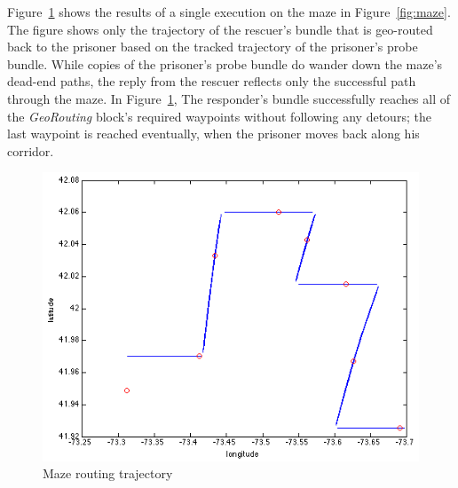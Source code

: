 Figure~\ref{fig:mazeExperiment} shows the results of a single
execution on the maze in Figure~\ref{fig:maze}. The figure shows only
the trajectory of the rescuer's bundle that is geo-routed back to the
prisoner based on the tracked trajectory of the prisoner's probe
bundle. While copies of the prisoner's probe bundle do wander down the
maze's dead-end paths, the reply from the rescuer reflects only the
successful path through the maze. In Figure~\ref{fig:mazeExperiment},
The responder's bundle successfully reaches all of the {\em
  GeoRouting} block's required waypoints without following any
detours; the last waypoint is reached eventually, when the prisoner
moves back along his corridor.
\begin{figure}
\begin{center}
\includegraphics[width=.8\columnwidth]{figures/MazeExperiment.png}
\end{center}
\vspace{-.75cm}
\caption{Maze routing trajectory}
\label{fig:mazeExperiment}
\vspace{-.5cm}
\end{figure}
